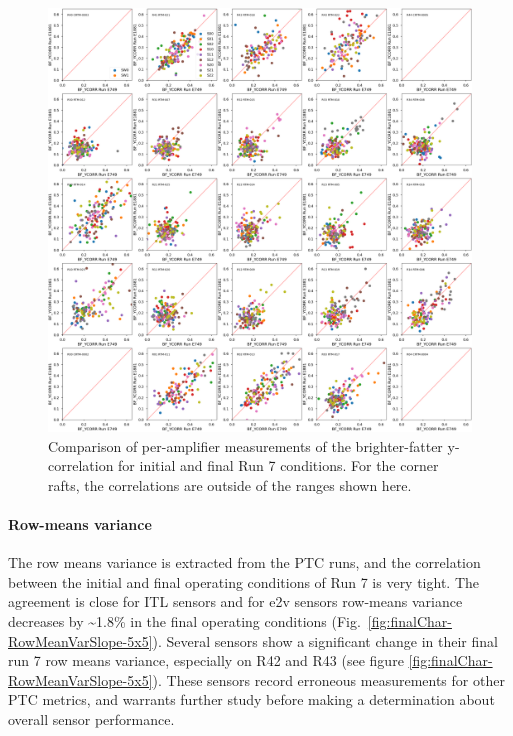 \begin{figure}[ht]
    \centering
    \includegraphics[width=0.7\linewidth]{figures/finalCharacterization/E749_E1881_BF_YCORR.png}
    \caption{Comparison of per-amplifier measurements of the brighter-fatter y-correlation for initial and final Run 7 conditions. For the corner rafts, the correlations are outside of the ranges shown here.}
    \label{fig:finalChar-BFYCorr-5x5}
\end{figure}


\clearpage
\paragraph{Row-means variance}\label{final-row-means-var}

The row means variance is extracted from the PTC runs, and the correlation between the initial and final operating conditions of Run 7 is very tight. The agreement is close for ITL sensors and for e2v sensors row-means variance decreases by \textasciitilde1.8\% in the final operating conditions (Fig.~\ref{fig:finalChar-RowMeanVarSlope-5x5}). Several sensors show a significant change in their final run 7 row means variance, especially on R42 and R43 (see figure \ref{fig:finalChar-RowMeanVarSlope-5x5}). These sensors record erroneous measurements for other PTC metrics, and warrants further study before making a determination about overall sensor performance.

